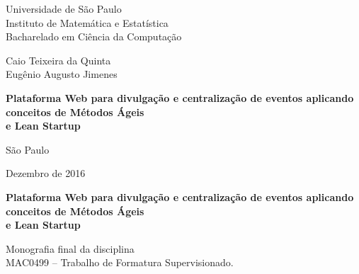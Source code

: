 \documentclass[12pt,twoside,a4paper]{book}
\begin{document}
\frontmatter
\fancyhead[RO]{{\footnotesize\rightmark}\hspace{2em}\thepage}
\setcounter{tocdepth}{2}
\fancyhead[LE]{\thepage\hspace{2em}\footnotesize{\leftmark}}
\fancyhead[RE,LO]{}
\fancyhead[RO]{{\footnotesize\rightmark}\hspace{2em}\thepage}

\onehalfspacing  %

\thispagestyle{empty}
\begin{center}
    \vspace*{2.3cm}
    Universidade de São Paulo\\
    Instituto de Matemática e Estatística\\
    Bacharelado em Ciência da Computação


    \vspace*{3cm}
    \Large Caio Teixeira da Quinta \\ Eugênio Augusto Jimenes


    \vspace{3cm}
    \textbf{\Large{Plataforma Web para divulgação e centralização de eventos aplicando conceitos de Métodos Ágeis \\ e Lean Startup }}


    \vskip 5cm
    \normalsize{São Paulo}

    \normalsize{Dezembro de 2016}
\end{center}

%
\newpage
\thispagestyle{empty}
    \begin{center}
        \vspace*{2.3 cm}
        \textbf{\Large{Plataforma Web para divulgação e centralização de eventos aplicando conceitos de Métodos Ágeis \\ e Lean Startup }}
        \vspace*{2 cm}
    \end{center}

    \vskip 2cm

    \begin{flushright}
    Monografia final da disciplina \\
        MAC0499 -- Trabalho de Formatura Supervisionado.
    \end{flushright}
\end{document}
